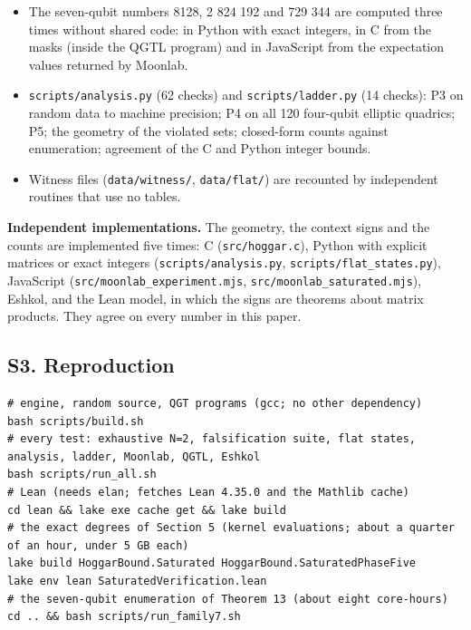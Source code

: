 \documentclass[11pt,a4paper]{article}
\begin{document}
\begin{itemize}
  \texttt{results/family7.log}. The two counts agree: 13 271 040 solutions found, and
  \(92\,897\,280/7 = 13\,271\,040\) for one orbit with a stabilizer of order 7.
\item
  The seven-qubit numbers 8128, 2 824 192 and 729 344 are computed three times without shared code: in
  Python with exact integers, in C from the masks (inside the QGTL program) and in JavaScript from the
  expectation values returned by Moonlab.
\item
  \texttt{scripts/analysis.py} (62 checks) and \texttt{scripts/ladder.py} (14 checks): P3 on random data to machine
  precision; P4 on all 120 four-qubit elliptic quadrics; P5; the geometry of the violated sets; closed-form
  counts against enumeration; agreement of the C and Python integer bounds.
\item
  Witness files (\texttt{data/witness/}, \texttt{data/flat/}) are recounted by independent routines that use no tables.
\end{itemize}

\textbf{Independent implementations.} The geometry, the context signs and the counts are implemented five
times: C (\texttt{src/hoggar.c}), Python with explicit matrices or exact integers (\texttt{scripts/analysis.py},
\texttt{scripts/flat\_states.py}), JavaScript (\texttt{src/moonlab\_experiment.mjs}, \texttt{src/moonlab\_saturated.mjs}),
Eshkol, and the Lean model, in which the signs are theorems about matrix products. They agree on every
number in this paper.

\subsection{S3. Reproduction}\label{s3-reproduction}

\begin{verbatim}
# engine, random source, QGT programs (gcc; no other dependency)
bash scripts/build.sh
# every test: exhaustive N=2, falsification suite, flat states, analysis, ladder, Moonlab, QGTL, Eshkol
bash scripts/run_all.sh
# Lean (needs elan; fetches Lean 4.35.0 and the Mathlib cache)
cd lean && lake exe cache get && lake build
# the exact degrees of Section 5 (kernel evaluations; about a quarter of an hour, under 5 GB each)
lake build HoggarBound.Saturated HoggarBound.SaturatedPhaseFive
lake env lean SaturatedVerification.lean
# the seven-qubit enumeration of Theorem 13 (about eight core-hours)
cd .. && bash scripts/run_family7.sh
\end{verbatim}
\end{document}

